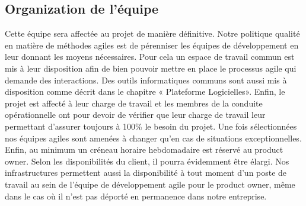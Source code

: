 \subsection{Organization de l'équipe}
Cette équipe sera affectée au projet de manière définitive. Notre politique qualité en matière de méthodes agiles est de pérenniser les équipes de développement en leur donnant les moyens nécessaires. Pour cela un espace de travail commun est mis à leur disposition afin de bien pouvoir mettre en place le processus agile qui demande des interactions. Des outils informatiques communs sont aussi mis à disposition comme décrit dans le chapitre « Plateforme Logicielles». Enfin, le projet est affecté à leur charge de travail et les membres de la conduite opérationnelle ont pour devoir de vérifier que leur charge de travail leur permettant d’assurer toujours à 100\% le besoin du projet. Une fois sélectionnées nos équipes agiles sont amenées à changer qu’en cas de situations exceptionnelles. Enfin, au minimum un créneau horaire hebdomadaire est réservé au product owner. Selon les disponibilités du client, il pourra évidemment être élargi. Nos infrastructures permettent aussi la disponibilité à tout moment d’un poste de travail au sein de l’équipe de développement agile pour le product owner, même dans le cas où il n’est pas déporté en permanence dans notre entreprise.  